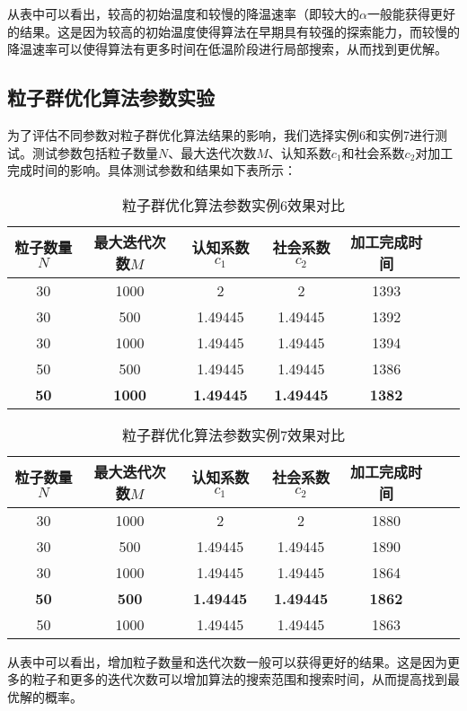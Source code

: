 \documentclass[12pt]{article}
\begin{document}
	从表中可以看出，较高的初始温度和较慢的降温速率（即较大的$\alpha$一般能获得更好的结果。这是因为较高的初始温度使得算法在早期具有较强的探索能力，而较慢的降温速率可以使得算法有更多时间在低温阶段进行局部搜索，从而找到更优解。
	\newpage
	\subsection{粒子群优化算法参数实验}
	为了评估不同参数对粒子群优化算法结果的影响，我们选择实例6和实例7进行测试。测试参数包括粒子数量$N$、最大迭代次数$M$、认知系数$c_1$和社会系数$c_2$对加工完成时间的影响。具体测试参数和结果如下表所示：
	
	\begin{table}[H]
		\centering
		\caption{粒子群优化算法参数实例6效果对比}
		\begin{tabular}{ccccccc}
			\toprule %
			粒子数量$N$&最大迭代次数$M$&认知系数$c_1$&社会系数$c_2$&加工完成时间 \\ %
			\midrule %
			30&1000&2&2&1393\\
			30&500&1.49445&1.49445&1392\\
			30&1000&1.49445&1.49445&1394\\
			50&500&1.49445&1.49445&1386\\
			\textbf{50}&\textbf{1000}&\textbf{1.49445}&\textbf{1.49445}&\textbf{1382}\\
			\bottomrule %
		\end{tabular}
	\end{table}
	
	\begin{table}[H]
		\centering
		\caption{粒子群优化算法参数实例7效果对比}
		\begin{tabular}{ccccccc}
			\toprule %
			粒子数量$N$&最大迭代次数$M$&认知系数$c_1$&社会系数$c_2$&加工完成时间 \\ %
			\midrule %
			30&1000&2&2&1880\\
			30&500&1.49445&1.49445&1890\\
			30&1000&1.49445&1.49445&1864\\
			\textbf{50}&\textbf{500}&\textbf{1.49445}&\textbf{1.49445}&\textbf{1862}\\
			50&1000&1.49445&1.49445&1863\\
			\bottomrule %
		\end{tabular}
	\end{table}
	
	从表中可以看出，增加粒子数量和迭代次数一般可以获得更好的结果。这是因为更多的粒子和更多的迭代次数可以增加算法的搜索范围和搜索时间，从而提高找到最优解的概率。
	
\end{document}
